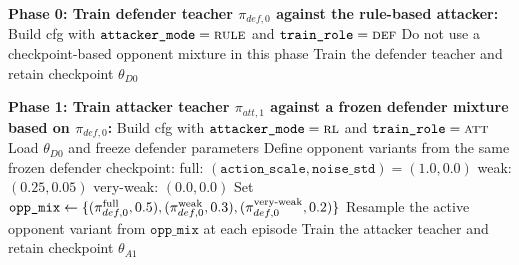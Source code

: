 \begin{algorithm}[H]
\caption{Phased Alternating Training Cycle with Opponent Randomization}
\label{alg:ppo_phases}
\begin{algorithmic}[1]
\State \textbf{Phase 0: Train defender teacher $\pi_{def,0}$ against the rule-based attacker:}
\State \hspace{1em} Build cfg with $\texttt{attacker\_mode}=\textsc{rule}$ and $\texttt{train\_role}=\textsc{def}$
\State \hspace{1em} Do not use a checkpoint-based opponent mixture in this phase
\State \hspace{1em} Train the defender teacher and retain checkpoint $\theta_{D0}$

\State \textbf{Phase 1: Train attacker teacher $\pi_{att,1}$ against a frozen defender mixture based on $\pi_{def,0}$:}
\State \hspace{1em} Build cfg with $\texttt{attacker\_mode}=\textsc{rl}$ and $\texttt{train\_role}=\textsc{att}$
\State \hspace{1em} Load $\theta_{D0}$ and freeze defender parameters
\State \hspace{1em} Define opponent variants from the same frozen defender checkpoint:
\Statex \hspace{2em} full: $(\texttt{action\_scale},\texttt{noise\_std})=(1.0,0.0)$
\Statex \hspace{2em} weak: $(0.25,0.05)$
\Statex \hspace{2em} very-weak: $(0.0,0.0)$
\State \hspace{1em} Set
\Statex \hspace{2em}
$\texttt{opp\_mix}\gets\{(\pi_{def,0}^{\text{full}},0.5),(\pi_{def,0}^{\text{weak}},0.3),(\pi_{def,0}^{\text{very\mbox{-}weak}},0.2)\}$
\State \hspace{1em} Resample the active opponent variant from $\texttt{opp\_mix}$ at each episode
\State \hspace{1em} Train the attacker teacher and retain checkpoint $\theta_{A1}$


\end{algorithmic}
\end{algorithm}
